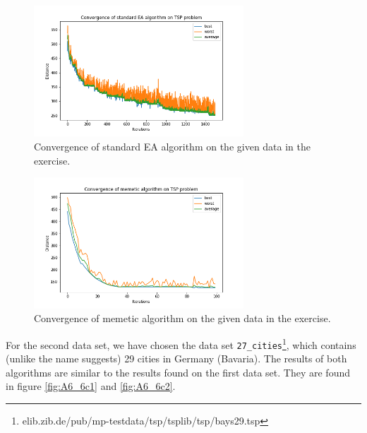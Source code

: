 \documentclass{article}
\begin{document}
\begin{enumerate}[label=\alph*)]
    \begin{figure}[H]
        \centering
        \includegraphics[width=0.7\textwidth]{Assignment 1/Figures/A1_6b1.png}
        \caption{Convergence of standard EA algorithm on the given data in the exercise.}
        \label{fig:A1_6b1}
    \end{figure}  
    \begin{figure}[H]
        \centering
        \includegraphics[width=0.7\textwidth]{Assignment 1/Figures/A1_6b2.png}
        \caption{Convergence of memetic algorithm on the given data in the exercise.}
        \label{fig:A1_6b2}
    \end{figure}
    
    For the second data set, we have chosen the data set \texttt{27\_cities}\footnote{elib.zib.de/pub/mp-testdata/tsp/tsplib/tsp/bays29.tsp}, which contains (unlike the name suggests) 29 cities in Germany (Bavaria). The results of both algorithms are similar to the results found on the first data set. They are found in figure \ref{fig:A6_6c1} and \ref{fig:A6_6c2}.
   

\end{enumerate}
\end{document}
